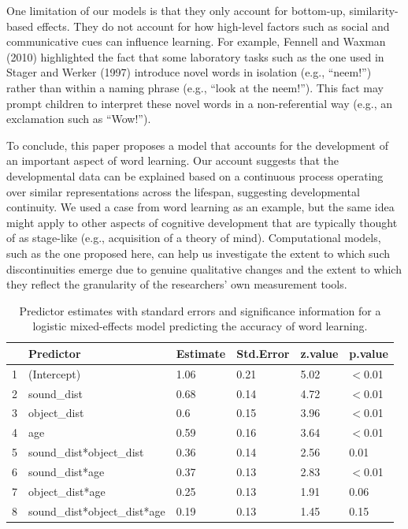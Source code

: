 \documentclass[english,,man]{apa6}
\theoremstyle{definition}
\theoremstyle{definition}
\theoremstyle{definition}
\theoremstyle{remark}
\begin{document}
One limitation of our models is that they only account for bottom-up,
similarity-based effects. They do not account for how high-level factors
such as social and communicative cues can influence learning. For
example, Fennell and Waxman (2010) highlighted the fact that some
laboratory tasks such as the one used in Stager and Werker (1997)
introduce novel words in isolation (e.g., \enquote{neem!}) rather than
within a naming phrase (e.g., \enquote{look at the neem!}). This fact
may prompt children to interpret these novel words in a non-referential
way (e.g., an exclamation such as \enquote{Wow!}).

To conclude, this paper proposes a model that accounts for the
development of an important aspect of word learning. Our account
suggests that the developmental data can be explained based on a
continuous process operating over similar representations across the
lifespan, suggesting developmental continuity. We used a case from word
learning as an example, but the same idea might apply to other aspects
of cognitive development that are typically thought of as stage-like
(e.g., acquisition of a theory of mind). Computational models, such as
the one proposed here, can help us investigate the extent to which such
discontinuities emerge due to genuine qualitative changes and the extent
to which they reflect the granularity of the researchers' own
measurement tools.

\vspace{1em}

\vspace{1em}

\begin{table}[ht]
\centering
\begin{tabular}{rlllll}
  \hline
 & Predictor & Estimate & Std.Error & z.value & p.value \\ 
  \hline
1 & (Intercept) & 1.06 & 0.21 & 5.02 & $<$0.01 \\ 
  2 & sound\_dist & 0.68 & 0.14 & 4.72 & $<$0.01 \\ 
  3 & object\_dist & 0.6 & 0.15 & 3.96 & $<$0.01 \\ 
  4 & age & 0.59 & 0.16 & 3.64 & $<$0.01 \\ 
  5 & sound\_dist*object\_dist & 0.36 & 0.14 & 2.56 & 0.01 \\ 
  6 & sound\_dist*age & 0.37 & 0.13 & 2.83 & $<$0.01 \\ 
  7 & object\_dist*age & 0.25 & 0.13 & 1.91 & 0.06 \\ 
  8 & sound\_dist*object\_dist*age & 0.19 & 0.13 & 1.45 & 0.15 \\ 
   \hline
\end{tabular}
\caption{Predictor estimates with standard errors and significance information for a logistic mixed-effects model predicting the accuracy of word learning.} 
\end{table}
\end{document}
